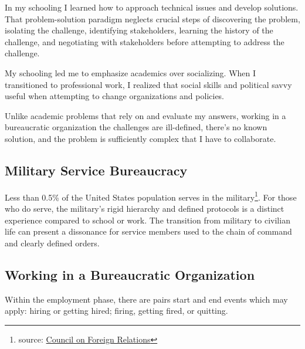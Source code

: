 
In my schooling I learned how to approach technical issues and develop solutions. That problem-solution paradigm neglects crucial steps of discovering the problem, isolating the challenge, identifying stakeholders, learning the history of the challenge, and negotiating with stakeholders before attempting to address the challenge. 

My schooling led me to emphasize academics over socializing. When I transitioned to professional work, I realized that social skills and political savvy useful when attempting to change organizations and policies. 

Unlike academic problems that rely on and evaluate my answers, working in a bureaucratic organization the challenges are ill-defined, there's no known solution, and the problem is sufficiently complex that I have to collaborate.







\subsection{Military Service Bureaucracy\label{bureaucracy-of-military}}
Less than 0.5\% of the United States population serves in the military\footnote{source: \href{https://www.cfr.org/backgrounder/demographics-us-military}{Council on Foreign Relations}}. For those who do serve, the military's rigid hierarchy and defined protocols is a distinct experience compared to school or work. The transition from military to civilian life can present a dissonance for service members used to the chain of command and clearly defined orders. 

\subsection{Working in a Bureaucratic Organization\label{sec:bureaucracy-of-work}}
Within the employment phase, there are pairs start and end events which may apply: hiring or getting hired; firing, getting fired, or quitting. 

